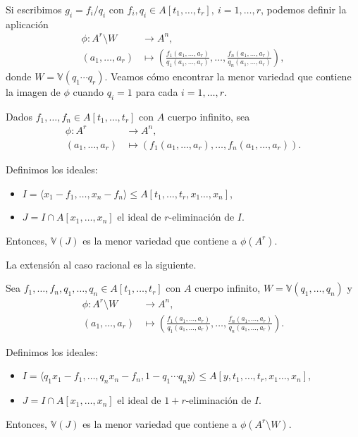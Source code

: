 Si escribimos $g_i = f_i/q_i$ con $f_i,q_i \in A[t_1,\dots, t_r],\ i=1,\dots, r$, podemos definir la aplicación
\begin{align*}
        \phi \colon A^r\setminus W  & \to A^n,\\
        (a_1,\dots, a_r) & \mapsto \left( \frac{f_1(a_1,\dots, a_r)}{q_1(a_1,\dots, a_r)}, \dots, \frac{f_n(a_1,\dots, a_r)}{q_n(a_1,\dots, a_r)}\right),
    \end{align*}
donde $W=\mathbb{V}(q_1\cdots q_r)$. Veamos cómo encontrar la menor variedad que contiene la imagen de $\phi$ cuando $q_i = 1$ para cada $i=1,\dots, r$. 
\begin{teorema}
    Dados $f_1,\dots, f_n \in A[t_1, \dots, t_r]$ con $A$ cuerpo infinito, sea
    \begin{align*}
        \phi \colon A^r  & \to A^n,\\
        (a_1,\dots, a_r) & \mapsto \left( f_1(a_1,\dots, a_r), \dots, f_n(a_1,\dots, a_r) \right).
    \end{align*}

    Definimos los ideales:
    \begin{itemize}
        \item $I = \langle x_1-f_1,\dots,  x_n-f_n\rangle \le A[t_1,\dots, t_r,x_1\dots, x_n]$,
        \item $J = I\cap A[x_1,\dots, x_n]$ el ideal de $r$-eliminación de $I$.
    \end{itemize}

    Entonces, $\mathbb{V}(J)$ es la menor variedad que contiene a $\phi(A^r)$.
\end{teorema}


La extensión al caso racional es la siguiente.
\begin{teorema}
    Sea $f_1,\dots, f_n, q_1,\dots, q_n \in A[t_1, \dots, t_r]$ con $A$ cuerpo infinito, $W=\mathbb{V}(q_1,\dots, q_n)$ y
    \begin{align*}
        \phi \colon A^r\setminus W  & \to A^n,\\
        (a_1,\dots, a_r) & \mapsto \left( \frac{f_1(a_1,\dots, a_r)}{q_1(a_1,\dots, a_r)}, \dots, \frac{f_n(a_1,\dots, a_r)}{q_n(a_1,\dots, a_r)}\right).
    \end{align*}

     Definimos los ideales:
    \begin{itemize}
        \item $I = \langle q_1x_1-f_1,\dots,  q_nx_n-f_n, 1-q_1\cdots q_ny\rangle \le A[y,t_1,\dots, t_r,x_1\dots, x_n]$,
        \item $J = I\cap A[x_1,\dots, x_n]$ el ideal de $1+r$-eliminación de $I$.
    \end{itemize}

    Entonces, $\mathbb{V}(J)$ es la menor variedad que contiene a $\phi(A^r\setminus W)$.
\end{teorema}

